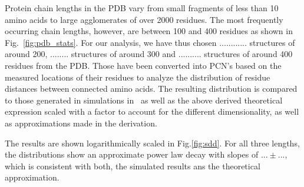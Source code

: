 \documentclass[
reprint,
twocolumn,
amsmath,amssymb,superscriptaddress,aps,
pre]{revtex4-1}
\newcommand{\red}[1]{\textcolor{red!80!black}{#1}}
\begin{document}
Protein chain lengths in the PDB vary from small fragments of less than 10 amino acids to large agglomerates of over 2000 residues. The most frequently occurring chain lengths, however, are between 100 and 400 residues as shown in Fig.~\ref{fig:pdb_stats}. \red{For our analysis, we have thus chosen ............ structures of around 200, ........ structures of around 300 and .......... structures of around 400 residues from the PDB.} Those have been converted into PCN's based on the measured locations of their residues to analyze the distribution of residue distances between connected amino acids. The resulting distribution is compared to those generated in simulations in~\cite{molkenthin2020self} as well as the above derived theoretical expression scaled with a factor to account for the different dimensionality, as well as approximations made in the derivation.

The results are shown logarithmically scaled in Fig.\ref{fig:sdd}. \red{For all three lengths, the distributions show an approximate power law decay with slopes of $...\pm ...$, which is consistent with both, the simulated results ans the theoretical approximation.}
\end{document}
